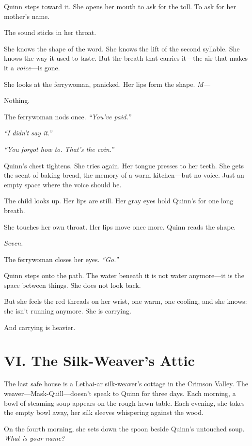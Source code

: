 \documentclass[11pt]{book}
\begin{document}
Quinn steps toward it. She opens her mouth to ask for the toll. To ask for her mother's name.

The sound sticks in her throat.

She knows the shape of the word. She knows the lift of the second syllable. She knows the way it used to taste. But the breath that carries it---the air that makes it a \emph{voice}---is gone.

She looks at the ferrywoman, panicked. Her lips form the shape. \emph{M---}

Nothing.

The ferrywoman nods once. \emph{``You've paid.''}

\emph{``I didn't say it.''}

\emph{``You forgot how to. That's the coin.''}

Quinn's chest tightens. She tries again. Her tongue presses to her teeth. She gets the scent of baking bread, the memory of a warm kitchen---but no voice. Just an empty space where the voice should be.

The child looks up. Her lips are still. Her gray eyes hold Quinn's for one long breath.

She touches her own throat. Her lips move once more. Quinn reads the shape.

\emph{Seven.}

The ferrywoman closes her eyes. \emph{``Go.''}

Quinn steps onto the path. The water beneath it is not water anymore---it is the space between things. She does not look back.

But she feels the red threads on her wrist, one warm, one cooling, and she knows: she isn't running anymore. She is carrying.

And carrying is heavier.

\section*{VI. The Silk-Weaver's Attic}

The last safe house is a Lethai-ar silk-weaver's cottage in the Crimson Valley. The weaver---Mask-Quill---doesn't speak to Quinn for three days. Each morning, a bowl of steaming soup appears on the rough-hewn table. Each evening, she takes the empty bowl away, her silk sleeves whispering against the wood.

On the fourth morning, she sets down the spoon beside Quinn's untouched soup. \textit{What is your name?}
\end{document}

